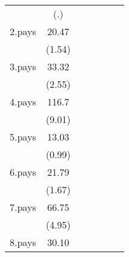 {\begin{tabular}{l*{6}{c}}
                    &         (.)         &                     &                     &                     &                     &                     \\
[1em]
2.pays              &       20.47         &                     &                     &                     &                     &                     \\
                    &      (1.54)         &                     &                     &                     &                     &                     \\
[1em]
3.pays              &       33.32\sym{*}  &                     &                     &                     &                     &                     \\
                    &      (2.55)         &                     &                     &                     &                     &                     \\
[1em]
4.pays              &       116.7\sym{***}&                     &                     &                     &                     &                     \\
                    &      (9.01)         &                     &                     &                     &                     &                     \\
[1em]
5.pays              &       13.03         &                     &                     &                     &                     &                     \\
                    &      (0.99)         &                     &                     &                     &                     &                     \\
[1em]
6.pays              &       21.79         &                     &                     &                     &                     &                     \\
                    &      (1.67)         &                     &                     &                     &                     &                     \\
[1em]
7.pays              &       66.75\sym{***}&                     &                     &                     &                     &                     \\
                    &      (4.95)         &                     &                     &                     &                     &                     \\
[1em]
8.pays              &       30.10\sym{*}  &                     &                     &                     &                     &                     \\

\end{tabular}}
